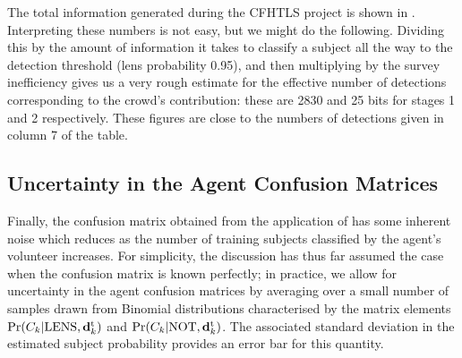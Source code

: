\documentclass[useAMS,usenatbib,a4paper]{mn2e}
\begin{document}
The total information generated during the CFHTLS project is shown in
. Interpreting these numbers is not easy, but we
might do the following. Dividing this by the amount of information it takes to
classify a \sw subject all the way to the detection threshold (lens
probability 0.95), and then multiplying by the survey inefficiency gives us a
very rough estimate for the effective number of detections corresponding to
the crowd's contribution: these are 2830 and 25 bits for stages 1 and 2
respectively.  These figures are close to the numbers of detections given in
column 7 of the table.  


\subsection{Uncertainty in the Agent Confusion Matrices}
\label{appendix:swap:uncertainty}

Finally, the confusion matrix obtained from the application of
 has some inherent noise which reduces as the
number of training subjects classified by the agent's volunteer
increases. For simplicity, the discussion has thus far assumed the case
when the confusion matrix is known perfectly; in practice, we allow for
uncertainty in the agent confusion matrices by averaging over a small
number of samples drawn from Binomial distributions characterised by the
matrix elements ${\rm Pr}(C_k|{\rm LENS},{\mathbf{d}^{\rm t}_k})$ and  ${\rm Pr}(C_k|{\rm NOT},{\mathbf{d}^{\rm t}_k})$. The
associated standard deviation in the estimated subject probability
provides an error bar for this quantity.

% 
\end{document}
